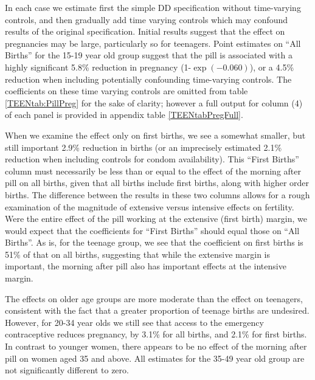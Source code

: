 In each case we estimate first the simple DD specification without 
time-varying controls, and then gradually add time varying controls which may 
confound results of the original specification.  Initial results suggest that the 
effect on pregnancies may be large, particularly so for teenagers.  Point 
estimates on ``All Births'' for the 15-19 year old group suggest that the pill is 
associated with a highly significant 5.8\% reduction in pregnancy 
(1-$\exp(-0.060)$), or a 4.5\% reduction when including potentially confounding 
time-varying controls.  The coefficients on these time varying controls are omitted 
from table \ref{TEENtab:PillPreg} for the sake of clarity; however a full output 
for column (4) of each panel is provided in appendix table \ref{TEENtabPregFull}.

When we examine the effect only on first births, we see a somewhat smaller, but
still important 2.9\% reduction in births (or an imprecisely estimated 2.1\% 
reduction when including controls for condom availability).  This ``First Births''
column must necessarily be less than or equal to the effect of the morning after 
pill on all births, given that all births include first births, along with higher 
order births.  The difference between the results in these two columns allows
for a rough examination of the magnitude of extensive versus intensive effects
on fertility.  Were the entire effect of the pill working at the extensive 
(first birth) margin, we would expect that the coefficients for ``First Births''
should equal those on ``All Births''.  As is, for the teenage group, we see
that the coefficient on first births is 51\% of that on all births, suggesting
that while the extensive margin is important, the morning after pill also has
important effects at the intensive margin.

The effects on older age groups are more moderate than the effect on teenagers,
consistent with the fact that a greater proportion of teenage births are
undesired.  However, for 20-34 year olds we still see that access to the 
emergency contraceptive reduces pregnancy, by 3.1\% for all births, and 2.1\% for 
first births.  In contrast to younger women, there appears to be no effect of the 
morning after pill on women aged 35 and above.  All estimates for the 35-49 
year old group are not significantly different to zero.

